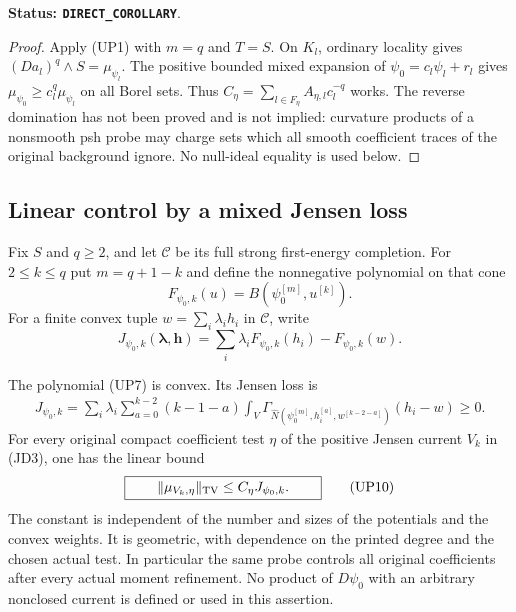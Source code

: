 \noindent\textbf{Status: \texttt{DIRECT\_COROLLARY}}.

\begin{proof}
Apply (UP1) with $m=q$ and $T=S$.  On $K_l$, ordinary locality
gives $(Da_l)^q\wedge S=\mu_{\psi_l}$.  The positive bounded
mixed expansion of $\psi_0=c_l\psi_l+r_l$ gives
$\mu_{\psi_0}\geq c_l^q\mu_{\psi_l}$ on all Borel sets.
Thus $C_\eta=\sum_{l\in F_\eta}A_{\eta,l}c_l^{-q}$ works.
The reverse domination has not been proved and is not implied:
curvature products of a nonsmooth psh probe may charge sets
which all smooth coefficient traces of the original background
ignore.  No null-ideal equality is used below.
\end{proof}

\subsection{Linear control by a mixed Jensen loss}

Fix $S$ and $q\geq2$, and let $\mathcal C$ be its full strong
first-energy completion.  For $2\leq k\leq q$ put $m=q+1-k$ and
define the nonnegative polynomial on that cone
\[
             F_{\psi_0,k}(u)=B(\psi_0^{[m]},u^{[k]}).
 \tag{UP7}
\]
For a finite convex tuple $w=\sum_i\lambda_i h_i$ in $\mathcal C$,
write
\[
 J_{\psi_0,k}(\boldsymbol\lambda,\mathbf h)
       =\sum_i\lambda_iF_{\psi_0,k}(h_i)-F_{\psi_0,k}(w).
 \tag{UP8}
\]

\begin{theorem}
\label{thm:r12-universal-jensen-detector}
The polynomial (UP7) is convex.  Its Jensen loss is
\[
 \begin{split}
 J_{\psi_0,k}
  =\sum_i\lambda_i\sum_{a=0}^{k-2}(k-1-a)
       \int_V\Gamma_{\widehat N(\psi_0^{[m]},h_i^{[a]},
                                     w^{[k-2-a]})}(h_i-w)
       \geq0.
 \end{split}
 \tag{UP9}
\]
For every original compact coefficient test $\eta$ of the positive
Jensen current $V_k$ in (JD3), one has the linear bound
\[
 \boxed{\qquad
              \|\mu_{V_k,\eta}\|_{\rm TV}
                         \leq C_\eta J_{\psi_0,k}.
 \qquad}
 \tag{UP10}
\]
The constant is independent of the number and sizes of the potentials
and the convex weights.  It is geometric, with dependence on the
printed degree and the chosen actual test.  In particular the same
probe controls all original coefficients after every actual moment
refinement.  No product of $D\psi_0$ with an arbitrary nonclosed
current is defined or used in this assertion.
\end{theorem}

